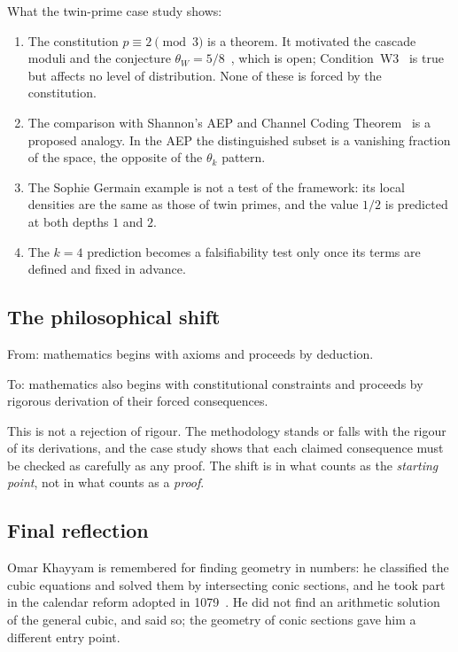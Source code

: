 \documentclass[12pt]{amsart}
\theoremstyle{plain}
\theoremstyle{definition}
\theoremstyle{remark}
\begin{document}
What the twin-prime case study shows:
\begin{enumerate}[label=(\arabic*)]
  \item The constitution $p \equiv 2 \pmod{3}$ is a theorem. It motivated the
    cascade moduli and the conjecture $\theta_W = 5/8$~\cite{WakilEisenstein},
    which is open; Condition~W3~\cite{WakilW3} is true but affects no level of
    distribution. None of these is forced by the constitution.
  \item The comparison with Shannon's AEP and Channel Coding
    Theorem~\cite{WakilShannon} is a proposed analogy. In the AEP the
    distinguished subset is a vanishing fraction of the space, the opposite of
    the $\theta_k$ pattern.
  \item The Sophie Germain example is not a test of the framework: its local
    densities are the same as those of twin primes, and the value $1/2$ is
    predicted at both depths $1$ and $2$.
  \item The $k = 4$ prediction becomes a falsifiability test only once its
    terms are defined and fixed in advance.
\end{enumerate}

\subsection{The philosophical shift}

From: mathematics begins with axioms and proceeds by deduction.

To: mathematics also begins with constitutional constraints and proceeds by
rigorous derivation of their forced consequences.

This is not a rejection of rigour. The methodology stands or falls with the
rigour of its derivations, and the case study shows that each claimed
consequence must be checked as carefully as any proof. The shift is in what
counts as the \emph{starting point}, not in what counts as a \emph{proof}.

\subsection{Final reflection}

Omar Khayyam is remembered for finding geometry in numbers: he classified the
cubic equations and solved them by intersecting conic sections, and he took
part in the calendar reform adopted in 1079~\cite{WakilKhayyam}. He did not
find an arithmetic solution of the general cubic, and said so; the geometry of
conic sections gave him a different entry point.
\end{document}
